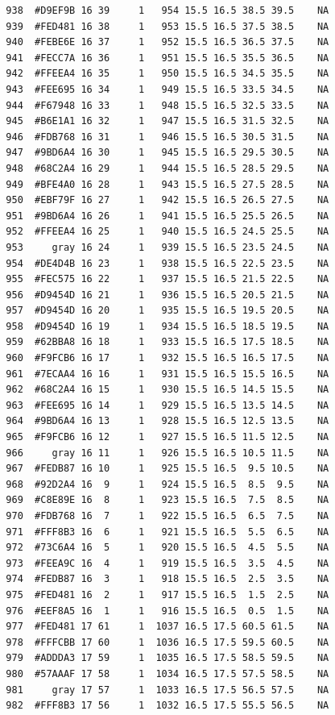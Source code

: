 \documentclass[12pt,twoside]{reedthesis}
\begin{document}
\begin{verbatim}
  938  #D9EF9B 16 39     1   954 15.5 16.5 38.5 39.5    NA
  939  #FED481 16 38     1   953 15.5 16.5 37.5 38.5    NA
  940  #FEBE6E 16 37     1   952 15.5 16.5 36.5 37.5    NA
  941  #FECC7A 16 36     1   951 15.5 16.5 35.5 36.5    NA
  942  #FFEEA4 16 35     1   950 15.5 16.5 34.5 35.5    NA
  943  #FEE695 16 34     1   949 15.5 16.5 33.5 34.5    NA
  944  #F67948 16 33     1   948 15.5 16.5 32.5 33.5    NA
  945  #B6E1A1 16 32     1   947 15.5 16.5 31.5 32.5    NA
  946  #FDB768 16 31     1   946 15.5 16.5 30.5 31.5    NA
  947  #9BD6A4 16 30     1   945 15.5 16.5 29.5 30.5    NA
  948  #68C2A4 16 29     1   944 15.5 16.5 28.5 29.5    NA
  949  #BFE4A0 16 28     1   943 15.5 16.5 27.5 28.5    NA
  950  #EBF79F 16 27     1   942 15.5 16.5 26.5 27.5    NA
  951  #9BD6A4 16 26     1   941 15.5 16.5 25.5 26.5    NA
  952  #FFEEA4 16 25     1   940 15.5 16.5 24.5 25.5    NA
  953     gray 16 24     1   939 15.5 16.5 23.5 24.5    NA
  954  #DE4D4B 16 23     1   938 15.5 16.5 22.5 23.5    NA
  955  #FEC575 16 22     1   937 15.5 16.5 21.5 22.5    NA
  956  #D9454D 16 21     1   936 15.5 16.5 20.5 21.5    NA
  957  #D9454D 16 20     1   935 15.5 16.5 19.5 20.5    NA
  958  #D9454D 16 19     1   934 15.5 16.5 18.5 19.5    NA
  959  #62BBA8 16 18     1   933 15.5 16.5 17.5 18.5    NA
  960  #F9FCB6 16 17     1   932 15.5 16.5 16.5 17.5    NA
  961  #7ECAA4 16 16     1   931 15.5 16.5 15.5 16.5    NA
  962  #68C2A4 16 15     1   930 15.5 16.5 14.5 15.5    NA
  963  #FEE695 16 14     1   929 15.5 16.5 13.5 14.5    NA
  964  #9BD6A4 16 13     1   928 15.5 16.5 12.5 13.5    NA
  965  #F9FCB6 16 12     1   927 15.5 16.5 11.5 12.5    NA
  966     gray 16 11     1   926 15.5 16.5 10.5 11.5    NA
  967  #FEDB87 16 10     1   925 15.5 16.5  9.5 10.5    NA
  968  #92D2A4 16  9     1   924 15.5 16.5  8.5  9.5    NA
  969  #C8E89E 16  8     1   923 15.5 16.5  7.5  8.5    NA
  970  #FDB768 16  7     1   922 15.5 16.5  6.5  7.5    NA
  971  #FFF8B3 16  6     1   921 15.5 16.5  5.5  6.5    NA
  972  #73C6A4 16  5     1   920 15.5 16.5  4.5  5.5    NA
  973  #FEEA9C 16  4     1   919 15.5 16.5  3.5  4.5    NA
  974  #FEDB87 16  3     1   918 15.5 16.5  2.5  3.5    NA
  975  #FED481 16  2     1   917 15.5 16.5  1.5  2.5    NA
  976  #EEF8A5 16  1     1   916 15.5 16.5  0.5  1.5    NA
  977  #FED481 17 61     1  1037 16.5 17.5 60.5 61.5    NA
  978  #FFFCBB 17 60     1  1036 16.5 17.5 59.5 60.5    NA
  979  #ADDDA3 17 59     1  1035 16.5 17.5 58.5 59.5    NA
  980  #57AAAF 17 58     1  1034 16.5 17.5 57.5 58.5    NA
  981     gray 17 57     1  1033 16.5 17.5 56.5 57.5    NA
  982  #FFF8B3 17 56     1  1032 16.5 17.5 55.5 56.5    NA

\end{verbatim}
\end{document}
